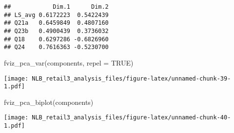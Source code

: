 \documentclass[
]{article}
\newenvironment{Shaded}{\begin{snugshade}}{\end{snugshade}}
\newcommand{\AttributeTok}[1]{\textcolor[rgb]{0.77,0.63,0.00}{#1}}
\newcommand{\CommentTok}[1]{\textcolor[rgb]{0.56,0.35,0.01}{\textit{#1}}}
\newcommand{\ConstantTok}[1]{\textcolor[rgb]{0.00,0.00,0.00}{#1}}
\newcommand{\FunctionTok}[1]{\textcolor[rgb]{0.00,0.00,0.00}{#1}}
\newcommand{\NormalTok}[1]{#1}
\newcommand{\OtherTok}[1]{\textcolor[rgb]{0.56,0.35,0.01}{#1}}
\newcommand{\SpecialCharTok}[1]{\textcolor[rgb]{0.00,0.00,0.00}{#1}}
\begin{document}
\begin{verbatim}
##            Dim.1      Dim.2
## LS_avg 0.6172223  0.5422439
## Q21a   0.6459849  0.4807160
## Q23b   0.4900439  0.3736032
## Q18    0.6297286 -0.6826960
## Q24    0.7616363 -0.5230700
\end{verbatim}

\begin{Shaded}
\begin{Highlighting}[]
\FunctionTok{fviz\_pca\_var}\NormalTok{(components, }\AttributeTok{repel =} \ConstantTok{TRUE}\NormalTok{)}
\end{Highlighting}
\end{Shaded}

\texttt{[image: NLB\_retail3\_analysis\_files/figure-latex/unnamed-chunk-39-1.pdf]}

\begin{Shaded}
\begin{Highlighting}[]
\FunctionTok{fviz\_pca\_biplot}\NormalTok{(components)}
\end{Highlighting}
\end{Shaded}

\texttt{[image: NLB\_retail3\_analysis\_files/figure-latex/unnamed-chunk-40-1.pdf]}

\begin{Shaded}
\end{Shaded}
\end{document}
